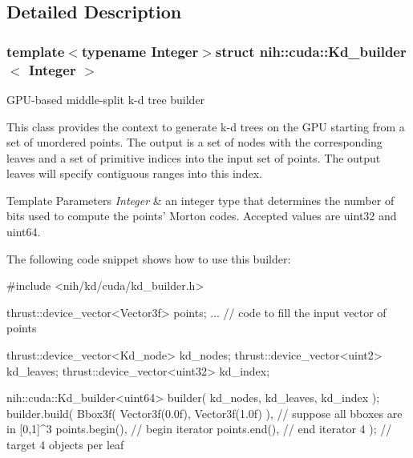\subsection{\-Detailed \-Description}
\subsubsection*{template$<$typename Integer$>$struct nih\-::cuda\-::\-Kd\-\_\-builder$<$ Integer $>$}

\-G\-P\-U-\/based middle-\/split k-\/d tree builder

\-This class provides the context to generate k-\/d trees on the \-G\-P\-U starting from a set of unordered points. \-The output is a set of nodes with the corresponding leaves and a set of primitive indices into the input set of points. \-The output leaves will specify contiguous ranges into this index.


\begin{DoxyTemplParams}{\-Template Parameters}
{\em \-Integer} & an integer type that determines the number of bits used to compute the points' \-Morton codes. \-Accepted values are uint32 and uint64.\\
\hline
\end{DoxyTemplParams}
\-The following code snippet shows how to use this builder\-:


\begin{DoxyCode}
 #include <nih/kd/cuda/kd_builder.h>

 thrust::device_vector<Vector3f> points;
 ... // code to fill the input vector of points

 thrust::device_vector<Kd_node>  kd_nodes;
 thrust::device_vector<uint2>    kd_leaves;
 thrust::device_vector<uint32>   kd_index;

 nih::cuda::Kd_builder<uint64> builder( kd_nodes, kd_leaves, kd_index );
 builder.build(
     Bbox3f( Vector3f(0.0f), Vector3f(1.0f) ),   // suppose all bboxes are in
       [0,1]^3
     points.begin(),                             // begin iterator
     points.end(),                               // end iterator
     4 );                                        // target 4 objects per leaf
\end{DoxyCode}
 

